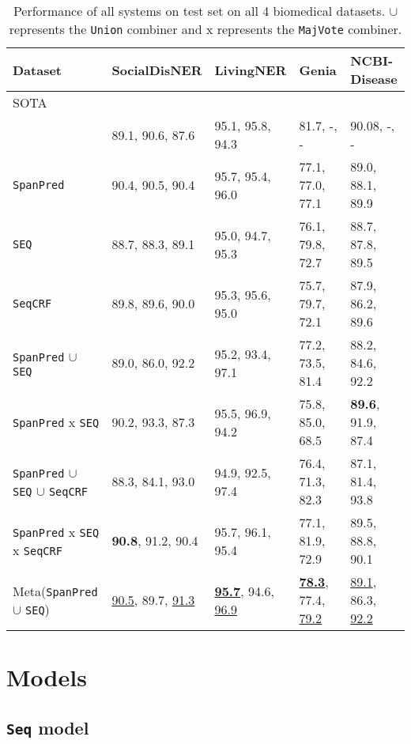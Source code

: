 \documentclass[11pt]{article}
\begin{document}
\begin{table*}[t]
  \centering
\begin{tabular}{|l|l|l|l|l|}
\hline
Dataset & SocialDisNER & LivingNER & Genia & NCBI-Disease \\ \hline
SOTA & \cite{fu-etal-2022-casia-smm4h22} & \cite{vicomtech} & \cite{shen-etal-2022-parallel} & \cite{tian2020improving} \\ \hline
 & 89.1, 90.6, 87.6 & 95.1, 95.8, 94.3 &  81.7, -, - & 90.08, -, - \\ \hline
\texttt{SpanPred} & 90.4, 90.5, 90.4 & 95.7, 95.4, 96.0 & 77.1, 77.0, 77.1 & 89.0, 88.1, 89.9 \\ \hline
\texttt{SEQ} & 88.7, 88.3, 89.1 & 95.0, 94.7, 95.3 & 76.1, 79.8, 72.7 & 88.7, 87.8, 89.5 \\ \hline
\texttt{SeqCRF} & 89.8, 89.6, 90.0 & 95.3, 95.6, 95.0 & 75.7, 79.7, 72.1 & 87.9, 86.2, 89.6 \\ \hline
\texttt{SpanPred} $\cup$ \texttt{SEQ} & 89.0, 86.0, 92.2 & 95.2, 93.4, 97.1 & 77.2, 73.5, 81.4 & 88.2, 84.6, 92.2 \\ \hline
\texttt{SpanPred} x \texttt{SEQ} & 90.2, 93.3, 87.3 & 95.5, 96.9, 94.2 & 75.8, 85.0, 68.5 & \textbf{89.6}, 91.9, 87.4 \\ \hline
\texttt{SpanPred} $\cup$ \texttt{SEQ} $\cup$ \texttt{SeqCRF} & 88.3, 84.1, 93.0 & 94.9, 92.5, 97.4 & 76.4, 71.3, 82.3 & 87.1, 81.4, 93.8 \\ \hline
\texttt{SpanPred} x \texttt{SEQ} x \texttt{SeqCRF} & \textbf{90.8}, 91.2, 90.4 & 95.7, 96.1, 95.4 & 77.1, 81.9, 72.9 & 89.5, 88.8, 90.1 \\ \hline
Meta(\texttt{SpanPred} $\cup$ \texttt{SEQ}) & \underline{90.5}, 89.7, \underline{91.3} & \underline{\textbf{95.7}}, 94.6, \underline{96.9} & \underline{\textbf{78.3}}, 77.4, \underline{79.2} & \underline{89.1}, 86.3, \underline{92.2} \\ \hline
\end{tabular}  

\caption{Performance of all systems on test set on all 4 biomedical datasets. $\cup$ represents the \texttt{Union} combiner and $\text{x}$ represents the \texttt{MajVote} combiner.}
  \label{tab:principle}
\end{table*}


\section{Models} \label{models} 


\subsection{\texttt{Seq} model} 
\end{document}

